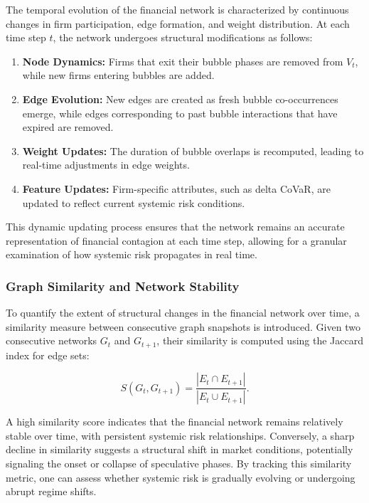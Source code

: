 \documentclass[preprint,12pt,authoryear]{elsarticle}
\begin{document}
The temporal evolution of the financial network is characterized by continuous changes in firm participation, edge formation, and weight distribution. At each time step \( t \), the network undergoes structural modifications as follows:

\begin{enumerate}
    \item \textbf{Node Dynamics:} Firms that exit their bubble phases are removed from \( V_t \), while new firms entering bubbles are added.
    \item \textbf{Edge Evolution:} New edges are created as fresh bubble co-occurrences emerge, while edges corresponding to past bubble interactions that have expired are removed.
    \item \textbf{Weight Updates:} The duration of bubble overlaps is recomputed, leading to real-time adjustments in edge weights.
    \item \textbf{Feature Updates:} Firm-specific attributes, such as delta CoVaR, are updated to reflect current systemic risk conditions.
\end{enumerate}

This dynamic updating process ensures that the network remains an accurate representation of financial contagion at each time step, allowing for a granular examination of how systemic risk propagates in real time.

\subsubsection{Graph Similarity and Network Stability}  

To quantify the extent of structural changes in the financial network over time, a similarity measure between consecutive graph snapshots is introduced. Given two consecutive networks \( G_t \) and \( G_{t+1} \), their similarity is computed using the Jaccard index for edge sets:

\[
S(G_t, G_{t+1}) = \frac{| E_t \cap E_{t+1} |}{| E_t \cup E_{t+1} |}.
\]

A high similarity score indicates that the financial network remains relatively stable over time, with persistent systemic risk relationships. Conversely, a sharp decline in similarity suggests a structural shift in market conditions, potentially signaling the onset or collapse of speculative phases. By tracking this similarity metric, one can assess whether systemic risk is gradually evolving or undergoing abrupt regime shifts.
\end{document}
